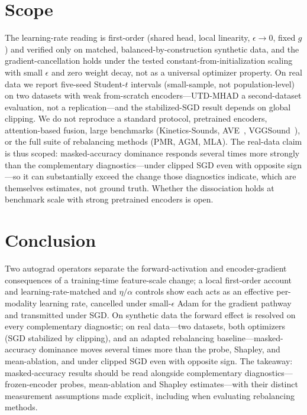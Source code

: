\documentclass[conference]{IEEEtran}
\begin{document}
\section{Scope}
\label{sec:discussion}
The learning-rate reading is first-order (shared head, local linearity, $\epsilon\!\to\!0$, fixed $g$) and verified only on matched, balanced-by-construction synthetic data, and the gradient-cancellation holds under the tested constant-from-initialization scaling with small $\epsilon$ and zero weight decay, not as a universal optimizer property. On real data we report five-seed Student-$t$ intervals (small-sample, not population-level) on two datasets with weak from-scratch encoders---UTD-MHAD a second-dataset evaluation, not a replication---and the stabilized-SGD result depends on global clipping. We do not reproduce a standard protocol, pretrained encoders, attention-based fusion, large benchmarks (Kinetics-Sounds, AVE~\cite{tian2018ave}, VGGSound~\cite{chen2020vggsound}), or the full suite of rebalancing methods (PMR, AGM, MLA). The real-data claim is thus scoped: masked-accuracy dominance responds several times more strongly than the complementary diagnostics---under clipped SGD even with opposite sign---so it can substantially exceed the change those diagnostics indicate, which are themselves estimates, not ground truth. Whether the dissociation holds at benchmark scale with strong pretrained encoders is open.

\section{Conclusion}
Two autograd operators separate the forward-activation and encoder-gradient consequences of a training-time feature-scale change; a local first-order account and learning-rate-matched and $\eta/\alpha$ controls show each acts as an effective per-modality learning rate, cancelled under small-$\epsilon$ Adam for the gradient pathway and transmitted under SGD. On synthetic data the forward effect is resolved on every complementary diagnostic; on real data---two datasets, both optimizers (SGD stabilized by clipping), and an adapted rebalancing baseline---masked-accuracy dominance moves several times more than the probe, Shapley, and mean-ablation, and under clipped SGD even with opposite sign. The takeaway: masked-accuracy results should be read alongside complementary diagnostics---frozen-encoder probes, mean-ablation and Shapley estimates---with their distinct measurement assumptions made explicit, including when evaluating rebalancing methods.
\end{document}
